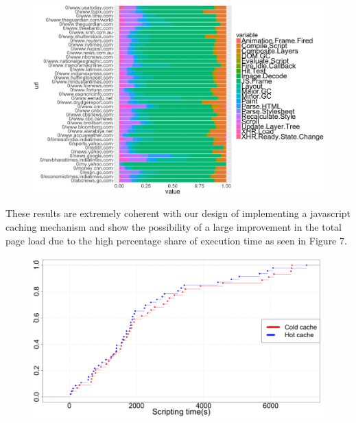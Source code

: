 \begin{figure}[t!]
\centering
\includegraphics[width=0.9\columnwidth]{figs/comp_2.png}
\label{fig:cat_p2}
\end{figure}


These results are extremely coherent with our design of implementing a javascript 
caching mechanism and show the possibility of a large improvement in the total page
load due to the high percentage share of execution time as seen in Figure 7. 

\begin{figure}[t]
\centering
\includegraphics[width=0.9\columnwidth]{figs/chrome_script.png}
\label{fig:scripting_p2}
\end{figure}

